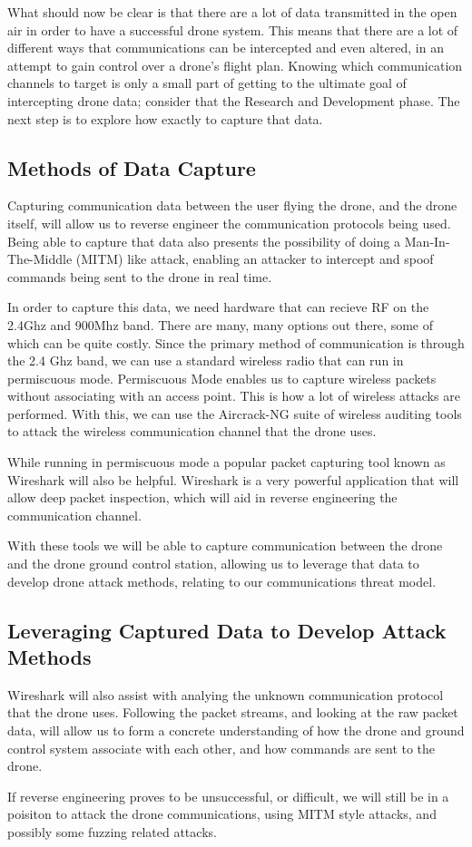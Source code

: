 \documentclass[IEEEtran,letterpaper,10pt,titlepage,draftclsnofoot,onecolumn]{article}
\begin{document}
What should now be clear is that there are a lot of data transmitted in the open air in order to have a successful
drone system. This means that there are a lot of different ways that communications can be intercepted and even
altered, in an attempt to gain control over a drone's flight plan. Knowing which communication channels to target
is only a small part of getting to the ultimate goal of intercepting drone data; consider that the Research and
Development phase. The next step is to explore how exactly to capture that data.

\subsection*{Methods of Data Capture}
Capturing communication data between the user flying the drone, and the drone itself, will allow us to reverse engineer
the communication protocols being used. Being able to capture that data also presents the possibility of doing a
Man-In-The-Middle (MITM) like attack, enabling an attacker to intercept and spoof commands being sent to the drone
in real time.

In order to capture this data, we need hardware that can recieve RF on the 2.4Ghz and 900Mhz band. There are many, many
options out there, some of which can be quite costly. Since the primary method of communication is through the 2.4 Ghz
band, we can use a standard wireless radio that can run in permiscuous mode\cite{WiFiPerc}. Permiscuous Mode enables
us to capture wireless packets without associating with an access point. This is how a lot of wireless attacks are
performed\cite{WiFiPerc}. With this, we can use the Aircrack-NG suite of wireless auditing tools to attack the wireless
communication channel that the drone uses\cite{AircrackNG}.

While running in permiscuous mode a popular packet capturing tool known as Wireshark will also be helpful. Wireshark
is a very powerful application that will allow deep packet inspection, which will aid in reverse engineering the
communication channel\cite{WiFiPerc}.

With these tools we will be able to capture communication between the drone and the drone ground control station, allowing
us to leverage that data to develop drone attack methods, relating to our communications threat model.

\subsection*{Leveraging Captured Data to Develop Attack Methods}

Wireshark will also assist with analying the unknown communication protocol that the drone uses. Following the packet
streams, and looking at the raw packet data, will allow us to form a concrete understanding of how the drone and
ground control system associate with each other, and how commands are sent to the drone\cite{UknProto}.

If reverse engineering proves to be unsuccessful, or difficult, we will still be in a poisiton to attack the drone
communications, using MITM style attacks, and possibly some fuzzing related attacks\cite{Fuzzy}.



\end{document}
